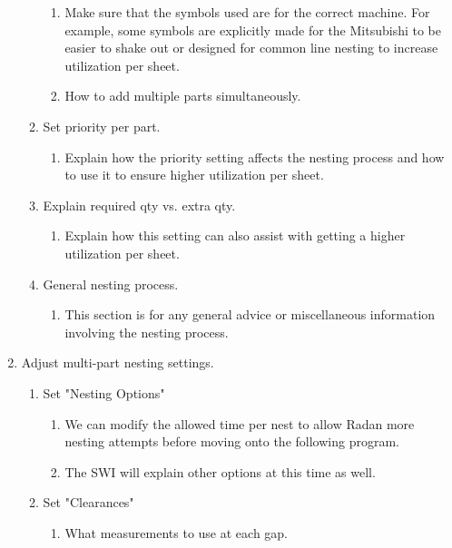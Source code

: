 \documentclass[11pt, a4paper, oneside]{report}
\begin{document}
\begin{enumerate}
\begin{enumerate}
\begin{enumerate}
                    \item Make sure that the symbols used are for the correct machine. For example, some symbols are explicitly made for the Mitsubishi to be easier to shake out or designed for common line nesting to increase utilization per sheet.
                    \item How to add multiple parts simultaneously.
                \end{enumerate}
            \item Set priority per part.
                \begin{enumerate}
                    \item Explain how the priority setting affects the nesting process and how to use it to ensure higher utilization per sheet.
                \end{enumerate}
            \item Explain required qty vs. extra qty.
                \begin{enumerate}
                    \item Explain how this setting can also assist with getting a higher utilization per sheet.
                \end{enumerate}
            \item General nesting process.
                \begin{enumerate}
                    \item This section is for any general advice or miscellaneous information involving the nesting process.
                \end{enumerate}
        \end{enumerate}
    \item Adjust multi-part nesting settings.
        \begin{enumerate}
            \item Set "Nesting Options"
                \begin{enumerate}
                    \item We can modify the allowed time per nest to allow Radan more nesting attempts before moving onto the following program.
                    \item The SWI will explain other options at this time as well.
                \end{enumerate}
            \item Set "Clearances"
                \begin{enumerate}
                    \item What measurements to use at each gap.

\end{enumerate}
\end{enumerate}
\end{enumerate}
\end{document}
